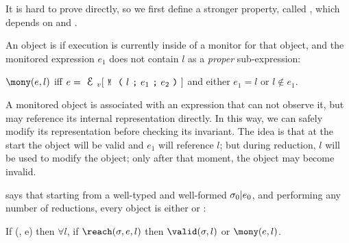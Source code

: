 





It is hard to prove  directly,
so we first define a stronger property,
called , which depends on \mony and \OK. 

An object is \mony if execution
is currently inside of a monitor for that object, and
the monitored expression $e_1$ does not
contain $l$ as a \emph{proper} sub-expression:

\indent $\mony(e,l)$ iff
$e=\EV[\M{l}{e_1}{e_2}]$ and either $e_1=l$ or $l \notin e_1$.%

\noindent A monitored object is associated with an expression that can not observe it, but may
reference its internal representation directly.
In this way, we can safely modify its representation before checking its invariant.
The idea is that at the start the object will be valid and $e_1$ will reference $l$;
but during reduction, $l$ will be used to
modify the object; only after that moment, the object may become invalid.

 says that starting from a well-typed and well-formed $\sigma_0|e_0$, and performing any number of reductions, every \reach object is either \valid or \mony:%
\SS\begin{theorem}\rm
If \VS(\s, e) then $\forall l$, if $\reach(\s, e, l)$ then $\valid(\s, l)$ or $\mony(e, l)$.
\end{theorem}


